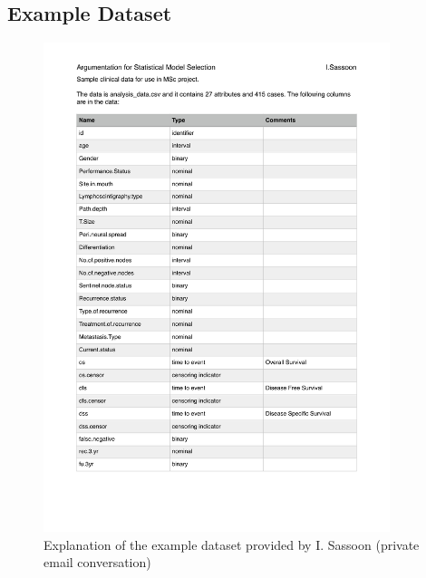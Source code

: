 \subsection{Example Dataset}
\label{app:dataset}
\begin{figure}[!h]
	\centering
	\includegraphics[page=1,width=0.9\textwidth]{appendix/analysis_data.pdf}
	\caption{Explanation of the example dataset provided by I. Sassoon (private email conversation)}
	\label{fig:dataset}
\end{figure}


